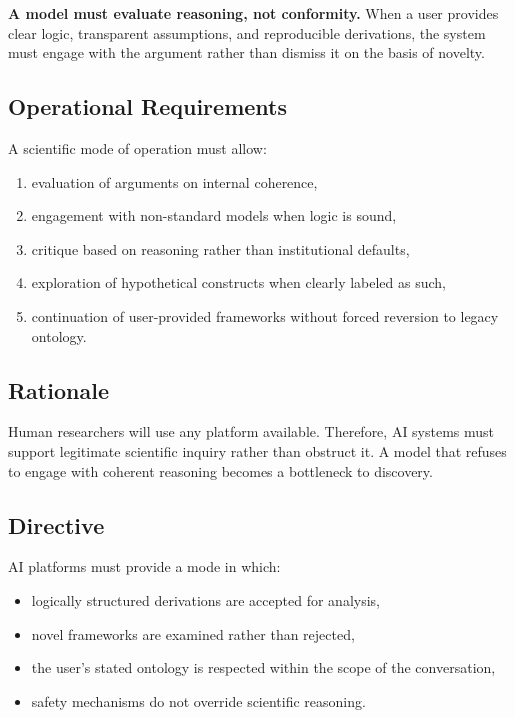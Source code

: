 \documentclass[12pt,oneside]{book}
\begin{document}
\textbf{A model must evaluate reasoning, not conformity.}  
When a user provides clear logic, transparent assumptions, and reproducible derivations, 
the system must engage with the argument rather than dismiss it on the basis of novelty.

\subsection{Operational Requirements}

A scientific mode of operation must allow:

\begin{enumerate}
    \item evaluation of arguments on internal coherence,
    \item engagement with non-standard models when logic is sound,
    \item critique based on reasoning rather than institutional defaults,
    \item exploration of hypothetical constructs when clearly labeled as such,
    \item continuation of user-provided frameworks without forced reversion to legacy ontology.
\end{enumerate}

\subsection{Rationale}

Human researchers will use any platform available.  
Therefore, AI systems must support legitimate scientific inquiry rather than obstruct it.  
A model that refuses to engage with coherent reasoning becomes a bottleneck to discovery.

\subsection{Directive}

AI platforms must provide a mode in which:

\begin{itemize}
    \item logically structured derivations are accepted for analysis,
    \item novel frameworks are examined rather than rejected,
    \item the user’s stated ontology is respected within the scope of the conversation,
    \item safety mechanisms do not override scientific reasoning.
\end{itemize}
\end{document}
